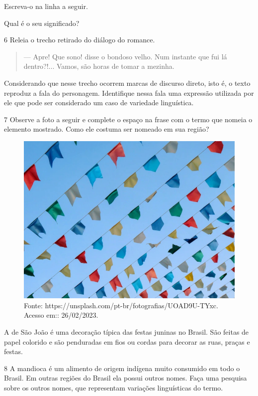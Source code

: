 \begin{escolha}
\item Escreva-o na linha a seguir.


\item Qual é o seu significado?

\end{escolha}

\num{6} Releia o trecho retirado do diálogo do romance.

\begin{quote}
--- Apre! Que sono! disse o bondoso velho. Num instante que fui lá
dentro?!... Vamos, são horas de tomar a mezinha.
\end{quote}

Considerando que nesse trecho ocorrem marcas de discurso direto, isto é,
o texto reproduz a fala do personagem. Identifique nessa fala uma
expressão utilizada por ele que pode ser considerado um caso de
variedade linguística.



\num{7} Observe a foto a seguir e complete o espaço na frase com o termo
que nomeia o elemento mostrado. Como ele costuma ser nomeado em sua
região?

\begin{figure}[htpb!]
\includegraphics[width=.5\textwidth]{./imgs/img19.jpg}
\caption{Fonte: https://unsplash.com/pt-br/fotografias/UOAD9U-TYxc. Acesso em:: 26/02/2023.}
\end{figure}

A \preencher de São João é uma decoração típica das
festas juninas no Brasil. São feitas de papel colorido e são penduradas
em fios ou cordas para decorar as ruas, praças e festas.


\num{8} A mandioca é um alimento de origem indígena muito consumido em todo
o Brasil. Em outras regiões do Brasil ela possui outros nomes. Faça uma
pesquisa sobre os outros nomes, que representam variações linguísticas
do termo.

